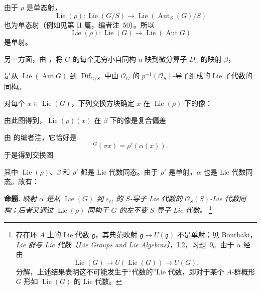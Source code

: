 由于 \(\rho\) 是单态射，
\[
 \operatorname{Lie}(\rho):
 \operatorname{Lie}(G/S)
 \longrightarrow
 \operatorname{Lie}(\operatorname{Aut}_S(G)/S)
\]
也为单态射（例如见第 II 篇，编者注~50）。所以
\[
  \operatorname{Lie}(\rho):
  \operatorname{Lie}(G)\longrightarrow
  \operatorname{Lie}(\operatorname{Aut}G)
\]
是单射。

另一方面，由 ，将 \(G\) 的每个无穷小自同构 \(u\) 映到微分算子 \(D_u\) 的映射 \(\beta\)，
\begin{center}
  \label{sga3:VIIA:2.5-beta-sequence}
  
\end{center}
是从 \(\operatorname{Lie}(\operatorname{Aut}G)\) 到 \(\operatorname{Dif}_{G/S}\) 中由 \(\mathcal O_G\) 的 \(p^{-1}(\mathcal O_S)\)-导子组成的 Lie 子代数的同构。

对每个 \(x\in\operatorname{Lie}(G)\)，下列交换方块确定 \(x\) 在 \(\operatorname{Lie}(\rho)\) 下的像：
\begin{center}
  \label{sga3:VIIA:2.5-lie-rho-square}
  
\end{center}
由此图得到，\(\operatorname{Lie}(\rho)(x)\) 在 \(\beta\) 下的像是复合偏差
\begin{center}
  \label{sga3:VIIA:2.5-composite-deviation}
  
\end{center}
由  的编者注，它恰好是
\[
  {}^G(\sigma x)=\rho'(\alpha(x)).
\]
于是得到交换图
\begin{center}
  \label{sga3:VIIA:2.5-lie-algebra-square}
  
\end{center}
其中 \(\operatorname{Lie}(\rho)\)、\(\beta\) 和 \(\rho'\) 都是 Lie 代数同态。由于 \(\rho'\) 是单射，\(\alpha\) 也是 Lie 代数同态。故有：

\medskip
\noindent\textbf{命题.}
\label{sga3:VIIA:2.5-proposition}
\textit{映射 \(\alpha\) 是从 \(\operatorname{Lie}(G)\) 到 \(\varepsilon_G\) 的 \(S\)-导子 Lie 代数的 \(\mathcal O_S(S)\)-Lie 代数同构；后者又通过 \(\operatorname{Lie}(\rho)\) 同构于 \(G\) 的左不变 \(S\)-导子 Lie 代数。}
\footnote{存在环 \(A\) 上的 Lie 代数 \(\mathfrak g\)，其典范映射 \(\mathfrak g\to U(\mathfrak g)\) 不是单射；见 Bourbaki，\emph{Lie 群与 Lie 代数〔Lie Groups and Lie Algebras〕}，I.2，习题~9。由于 \(\alpha\) 经由
\[
  \operatorname{Lie}(G)\longrightarrow
  U(\operatorname{Lie}(G))\longrightarrow U(G),
\]
分解，上述结果表明这不可能发生于“代数的”Lie 代数，即对于某个 \(A\)-群概形 \(G\) 形如 \(\operatorname{Lie}(G)\) 的 Lie 代数。}


